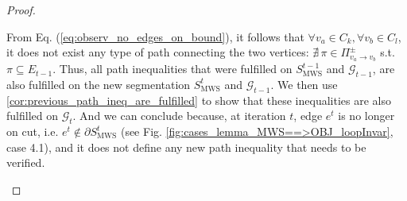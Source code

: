 \begin{proof}
\begin{itemize}
From Eq. (\ref{eq:observ_no_edges_on_bound}), it follows that $\forall v_a\in C_k, \forall v_b\in C_l$, it does not exist any type of path connecting the two vertices: $\nexists\, \pi\in\Pi_{v_{a}\rightarrow v_{b}}^{\pm}$ s.t. $\pi \subseteq E_{t-1}$. Thus, all path inequalities that were fulfilled on $S_{\mathrm{MWS}}^{t-1}$ and $\mathcal{G}_{t-1}$, are also fulfilled on the new segmentation $S_{\mathrm{MWS}}^{t}$ and $\mathcal{G}_{t-1}$. We then use \autoref{cor:previous_path_ineq_are_fulfilled} to show that these inequalities are also fulfilled on $\mathcal{G}_{t}$. And we can conclude because, at iteration $t$, edge $e^t$ is no longer on cut, i.e. $e^t \notin \partial S_{\mathrm{MWS}}^{t}$ (see Fig. \ref{fig:cases_lemma_MWS==>OBJ_loopInvar}, case 4.1), and it does not define any new path inequality that needs to be verified.








\end{itemize}
\end{proof}
